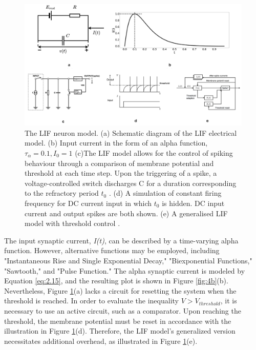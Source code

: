\begin{figure}[htbp!] 
\centering    
\includegraphics[width=1\textwidth]{Chapter2/Figs/2d.png}
\caption[The Leaky Integrate-and-Fire neuron model.]{The LIF neuron model. (a) Schematic diagram of the LIF electrical model. (b) Input current in the form of an alpha function, $\tau_{\alpha} = 0.1, I_0 = 1$ (c)The LIF model allows for the control of spiking behaviour through a comparison of membrane potential and threshold at each time step. Upon the triggering of a spike, a voltage-controlled switch discharges C for a duration corresponding to the refractory period $t_0$ \cite{tal1997computing}. (d) A simulation of constant firing frequency for DC current input in which $t_0$ is hidden. DC input current and output spikes are both shown. (e) A generalised LIF model with threshold control \cite{teeter2018generalized}. }
\label{fig:2d}
\end{figure}

\noindent The input synaptic current, \textit{I(t)}, can be described by a time-varying alpha function. However, alternative functions may be employed, including "Instantaneous Rise and Single Exponential Decay," "Biexponential Functions," "Sawtooth," and "Pulse Function." The alpha synaptic current is modeled by Equation \ref{eq:2.15}, and the resulting plot is shown in Figure \ref{fig:4b}(b). \\

\noindent Nevertheless, Figure \ref{fig:2d}(a) lacks a circuit for resetting the system when the threshold is reached. In order to evaluate the inequality $V > V_{threshold}$, it is necessary to use an active circuit, such as a comparator. Upon reaching the threshold, the membrane potential must be reset in accordance with the illustration in Figure \ref{fig:2d}(d). Therefore, the LIF model's generalized version necessitates additional overhead, as illustrated in Figure \ref{fig:2d}(e). \\

